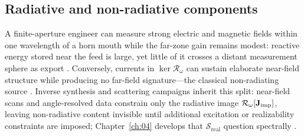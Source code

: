 \subsection{Radiative and non-radiative components}
\label{sec:ch254}
A finite-aperture engineer can measure strong electric and magnetic fields within one wavelength
of a horn mouth while the far-zone gain remains modest: reactive energy stored near the feed
is large, yet little of it crosses a distant measurement sphere as export
\cite{poynting1884}. Conversely, currents in $\ker\mathcal{R}_\omega$ can sustain
elaborate near-field structure while producing no far-field signature---the classical
non-radiating source \cite{harrington2001}. Inverse synthesis and scattering campaigns inherit
this split: near-field scans and angle-resolved data constrain only the radiative image
$\mathcal{R}_\omega[\mathbf{J}_{\mathrm{imp}}]$, leaving non-radiative content invisible until additional
excitation or realizability constraints are imposed; Chapter~\ref{ch:04} develops that
$\mathcal{S}_{\mathrm{real}}$ question spectrally \cite{stratton1941}.


